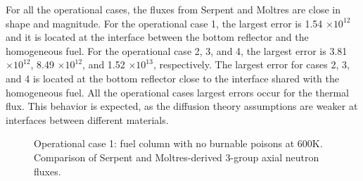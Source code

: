 For all the operational cases, the fluxes from Serpent and Moltres are close in shape and magnitude.
For the operational case 1, the largest error is 1.54 $\times 10^12$ and it is located at the interface between the bottom reflector and the homogeneous fuel.
For the operational case 2, 3, and 4, the largest error is 3.81 $\times 10^12$, 8.49 $\times 10^12$, and 1.52 $\times 10^13$, respectively.
The largest error for cases 2, 3, and 4 is located at the bottom reflector close to the interface shared with the homogeneous fuel.
All the operational cases largest errors occur for the thermal flux.
This behavior is expected, as the diffusion theory assumptions are weaker at interfaces between different materials.

\begin{figure}[htbp!]
	\centering
	\hfill
  \caption{Operational case 1: fuel column with no burnable poisons at 600K. Comparison of Serpent and Moltres-derived 3-group axial neutron fluxes.}
	\label{fig:assembly-noLBP-600-flux}
\end{figure}

